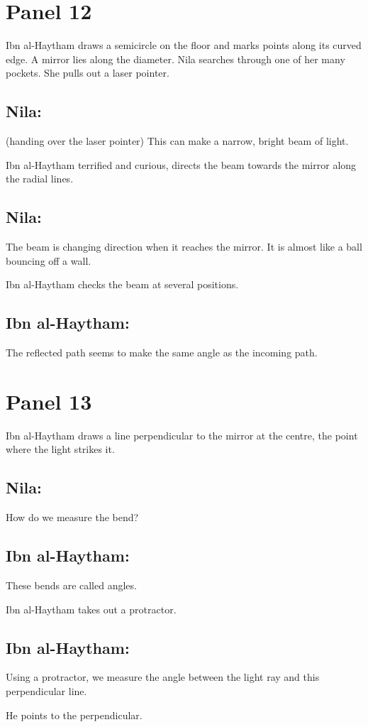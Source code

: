 \documentclass{xtufte-handout}
\begin{document}
\section{Panel 12}
Ibn al-Haytham draws a semicircle on the floor and marks points along its curved edge. A mirror lies along the diameter. Nila searches through one of her many pockets. She pulls out a laser pointer.
\subsection{Nila:} (handing over the laser pointer) This can make a narrow, bright beam of light.

Ibn al-Haytham terrified and curious, directs the beam towards the mirror along the radial lines.
\subsection{Nila:} The beam is changing direction when it reaches the mirror. It is almost like a ball bouncing off a wall.

Ibn al-Haytham checks the beam at several positions.

\subsection{Ibn al-Haytham:}The reflected path seems to make the same angle as the incoming path.
\section{Panel 13}
Ibn al-Haytham draws a line perpendicular to the mirror at the centre, the point where the light strikes it.
\subsection{Nila:} How do we measure the bend?
\subsection{Ibn al-Haytham:} These bends are called angles.

Ibn al-Haytham takes out a protractor.
\subsection{Ibn al-Haytham:} Using a protractor, we measure the angle between the light ray and this perpendicular line.

He points to the perpendicular.
\end{document}

